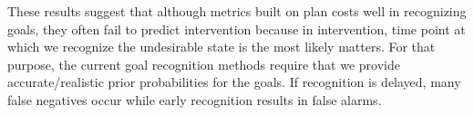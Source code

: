 \documentclass[letterpaper]{article}
\theoremstyle{plain}
\begin{document}
These results suggest that although metrics built on plan costs well in recognizing goals, they often fail to predict intervention because in intervention, time point at which we recognize the undesirable state is the most likely matters. For that purpose, the current goal recognition methods require that we provide accurate/realistic prior probabilities for the goals. If recognition is delayed, many false negatives occur while early recognition results in false alarms.

%
%
\end{document}
